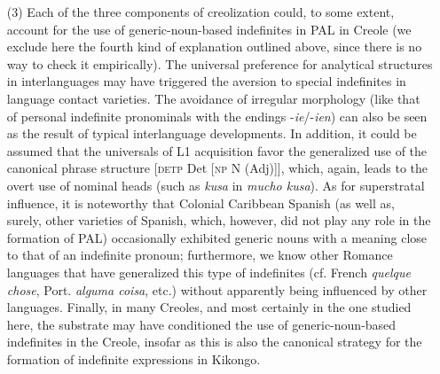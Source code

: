 \documentclass[output=paper,colorlinks,citecolor=brown]{langscibook}
\begin{document}
\begin{enumerate}
    \item[(3)] Each of the three components of creolization could, to some extent, account for the use of generic-noun-based indefinites in PAL in Creole (we exclude here the fourth kind of explanation outlined above, since there is no way to check it empirically). The universal preference for analytical structures in interlanguages may have triggered the aversion to special indefinites in language contact varieties. The avoidance of irregular morphology (like that of personal indefinite pronominals with the endings -\textit{ie}\slash-\textit{ien}) can also be seen as the result of typical interlanguage developments. In addition, it could be assumed that the universals of L1 acquisition favor the generalized use of the canonical phrase structure [\textsc{detp} Det [\textsc{np} N (Adj)]], which, again, leads to the overt use of nominal heads (such as \textit{kusa} in \textit{mucho kusa}). As for superstratal influence, it is noteworthy that Colonial Caribbean Spanish (as well as, surely, other varieties of Spanish, which, however, did not play any role in the formation of PAL) occasionally exhibited generic nouns with a meaning close to that of an indefinite pronoun; furthermore, we know other Romance languages that have generalized this type of indefinites (cf. French \textit{quelque chose}, Port. \textit{alguma coisa}, etc.) without apparently being influenced by other languages. Finally, in many Creoles, and most certainly in the one studied here, the substrate may have conditioned the use of generic-noun-based indefinites in the Creole, insofar as this is also the canonical strategy for the formation of indefinite expressions in Kikongo.

\end{enumerate}
\end{document}
